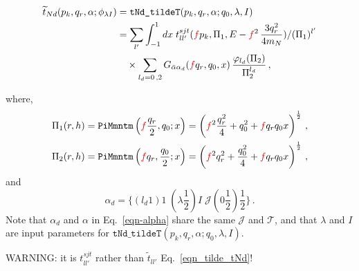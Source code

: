 \documentclass[11pt,aps]{revtex4}
\newcommand{\PF}{{\color{red}f}}
\newcommand{\orig}[1]{{\color{red} #1 }}
\begin{document}
\begin{equation}
\begin{split}
    \widetilde{t}_{Nd}(p_k, q_r, \alpha; \phi_{\lambda I}) &= \texttt{tNd\_tildeT}(p_k, q_r, \alpha; q_0, \lambda, I) \\
    &= \sum_{l'} \int_{-1}^1 dx\; t_{ll'}^{sjt}  (\PF p_k, \Pi_1, E - \PF^2\,  \frac{3q_r^2}{4m_N}) / (\Pi_1)^{l'} \\
    & \quad \times \sum_{l_d = 0\, , 2}  G_{\bar{\alpha} \alpha_d} (\PF q_r, q_0, x)\, \frac{\varphi_{l_d}(\Pi_2)}{\Pi_2^{l_d}}
    \, ,
\end{split}\label{eqn_tilde_tNd}
\end{equation}

where,
\begin{equation}
\begin{split}
  \Pi_1(r, h) &= \texttt{PiMmntm}\left(\PF \frac{q_r}{2}, q_0; x\right) = \left(\PF^2 \frac{q_r^2}{4} + q_0^2 + \PF q_r q_0 x \right)^{\frac{1}{2}} \, ,\\
  \Pi_2(r, h) &= \texttt{PiMmntm}\left(\PF q_r, \frac{q_0}{2}; x\right) = \left(\PF^2 q_r^2 + \frac{q_0^2}{4} + \PF q_r q_0 x \right)^{\frac{1}{2}} \, ,
\end{split}
\end{equation}
and
\begin{equation}
  \alpha_d = \{(l_d 1) 1\; (\lambda \frac{1}{2}) I\; \mathcal{J} (0 \frac{1}{2}) \frac{1}{2} \} \, .
\end{equation}
Note that $\alpha_d$ and $\alpha$ in Eq.~\eqref{eqn-alpha} share the same $\mathcal{J}$ and $\mathcal{T}$, and that $\lambda$ and $I$ are input parameters for $\texttt{tNd\_tildeT}(p_k, q_r, \alpha; q_0, \lambda, I)$.

WARNING: it is $t_{ll'}^{sjt}$ rather than $\widetilde{t}_{ll'}$ Eq.~\eqref{eqn_tilde_tNd}!

\end{document}
